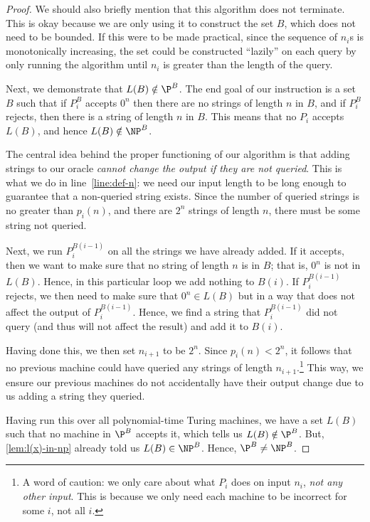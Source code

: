 \documentclass[english]{reedthesis}
\theoremstyle{plain}
\theoremstyle{definition}
\theoremstyle{remark}
\begin{document}
\begin{proof}
  We should also briefly mention that this algorithm does not terminate. This is
  okay because we are only using it to construct the set $B$, which does not
  need to be bounded. If this were to be made practical, since the sequence of
  $n_{i}$s is monotonically increasing, the set could be constructed ``lazily''
  on each query by only running the algorithm until $n_{i}$ is greater than the
  length of the query.

  Next, we demonstrate that $L(B) \notin \P^{B}$. The end goal of our instruction is
  a set $B$ such that if $P_{i}^{B}$ accepts $0^{n}$ then there are no strings
  of length $n$ in $B$, and if $P_{i}^{B}$ rejects, then there is a string of
  length $n$ in $B$. This means that no $P_{i}$ accepts $L(B)$, and hence
  $L(B) \notin \NP^{B}$.

  The central idea behind the proper functioning of our algorithm is that adding
  strings to our oracle \emph{cannot change the output if they are not queried}.
  This is what we do in line~\ref{line:def-n}: we need our input length to be
  long enough to guarantee that a non-queried string exists. Since the number of
  queried strings is no greater than $p_{i}(n)$, and there are $2^{n}$ strings
  of length $n$, there must be some string not queried.

  Next, we run $P_{i}^{B(i-1)}$ on all the strings we have already added. If it
  accepts, then we want to make sure that no string of length $n$ is in $B$;
  that is, $0^{n}$ is not in $L(B)$. Hence, in this particular loop we add
  nothing to $B(i)$. If $P_{i}^{B(i-1)}$ rejects, we then need to make sure that
  $0^{n} \in L(B)$ but in a way that does not affect the output of
  $P_{i}^{B(i-1)}$. Hence, we find a string that $P_{i}^{B(i-1)}$ did not query
  (and thus will not affect the result) and add it to $B(i)$.

  Having done this, we then set $n_{i+1}$ to be $2^{n}$. Since
  $p_{i}(n) < 2^{n}$, it follows that no previous machine could have queried any
  strings of length $n_{i+1}$.\footnote{A word of caution: we only care about
    what $P_{i}$ does on input $n_{i}$, \emph{not any other input}. This is
    because we only need each machine to be incorrect for some $i$, not all
    $i$.} This way, we ensure our previous machines do not accidentally have
  their output change due to us adding a string they queried.

  Having run this over all polynomial-time Turing machines, we have a set $L(B)$
  such that no machine in $\P^{B}$ accepts it, which tells us $L(B) \notin \P^{B}$.
  But, \cref{lem:l(x)-in-np} already told us $L(B) \in \NP^{B}$. Hence,
  $\P^{B} \ne \NP^{B}$.
\end{proof}
\end{document}
